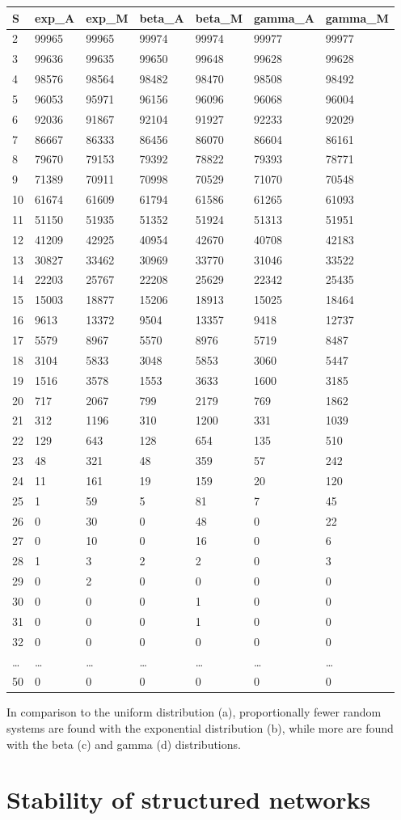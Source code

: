 \documentclass[]{article}
\begin{document}
\begin{longtable}[]{@{}lllllll@{}}
\toprule
S & exp\_A & exp\_M & beta\_A & beta\_M & gamma\_A &
gamma\_M\tabularnewline
\midrule
\endhead
2 & 99965 & 99965 & 99974 & 99974 & 99977 & 99977\tabularnewline
3 & 99636 & 99635 & 99650 & 99648 & 99628 & 99628\tabularnewline
4 & 98576 & 98564 & 98482 & 98470 & 98508 & 98492\tabularnewline
5 & 96053 & 95971 & 96156 & 96096 & 96068 & 96004\tabularnewline
6 & 92036 & 91867 & 92104 & 91927 & 92233 & 92029\tabularnewline
7 & 86667 & 86333 & 86456 & 86070 & 86604 & 86161\tabularnewline
8 & 79670 & 79153 & 79392 & 78822 & 79393 & 78771\tabularnewline
9 & 71389 & 70911 & 70998 & 70529 & 71070 & 70548\tabularnewline
10 & 61674 & 61609 & 61794 & 61586 & 61265 & 61093\tabularnewline
11 & 51150 & 51935 & 51352 & 51924 & 51313 & 51951\tabularnewline
12 & 41209 & 42925 & 40954 & 42670 & 40708 & 42183\tabularnewline
13 & 30827 & 33462 & 30969 & 33770 & 31046 & 33522\tabularnewline
14 & 22203 & 25767 & 22208 & 25629 & 22342 & 25435\tabularnewline
15 & 15003 & 18877 & 15206 & 18913 & 15025 & 18464\tabularnewline
16 & 9613 & 13372 & 9504 & 13357 & 9418 & 12737\tabularnewline
17 & 5579 & 8967 & 5570 & 8976 & 5719 & 8487\tabularnewline
18 & 3104 & 5833 & 3048 & 5853 & 3060 & 5447\tabularnewline
19 & 1516 & 3578 & 1553 & 3633 & 1600 & 3185\tabularnewline
20 & 717 & 2067 & 799 & 2179 & 769 & 1862\tabularnewline
21 & 312 & 1196 & 310 & 1200 & 331 & 1039\tabularnewline
22 & 129 & 643 & 128 & 654 & 135 & 510\tabularnewline
23 & 48 & 321 & 48 & 359 & 57 & 242\tabularnewline
24 & 11 & 161 & 19 & 159 & 20 & 120\tabularnewline
25 & 1 & 59 & 5 & 81 & 7 & 45\tabularnewline
26 & 0 & 30 & 0 & 48 & 0 & 22\tabularnewline
27 & 0 & 10 & 0 & 16 & 0 & 6\tabularnewline
28 & 1 & 3 & 2 & 2 & 0 & 3\tabularnewline
29 & 0 & 2 & 0 & 0 & 0 & 0\tabularnewline
30 & 0 & 0 & 0 & 1 & 0 & 0\tabularnewline
31 & 0 & 0 & 0 & 1 & 0 & 0\tabularnewline
32 & 0 & 0 & 0 & 0 & 0 & 0\tabularnewline
\ldots{} & \ldots{} & \ldots{} & \ldots{} & \ldots{} & \ldots{} &
\ldots{}\tabularnewline
50 & 0 & 0 & 0 & 0 & 0 & 0\tabularnewline
\bottomrule
\end{longtable}

In comparison to the uniform distribution (a), proportionally fewer
random systems are found with the exponential distribution (b), while
more are found with the beta (c) and gamma (d) distributions.

\hypertarget{structured}{\section{Stability of structured
networks}\label{structured}}
\end{document}
